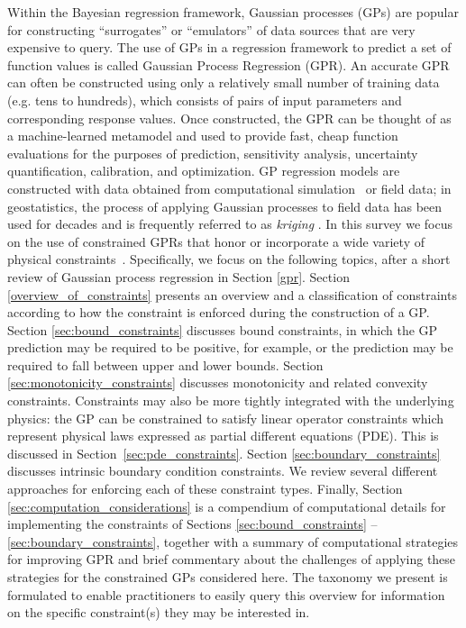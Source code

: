 Within the Bayesian regression framework, Gaussian processes (GPs) are popular for constructing ``surrogates'' or ``emulators'' of data sources that are very expensive to query.  The use of GPs in a 
regression framework to predict a set of function values is called Gaussian Process Regression (GPR). 
An accurate GPR can often be constructed using only a relatively small number of training data (e.g. tens to hundreds), which consists of pairs of input 
parameters and corresponding response values.  Once constructed, the GPR can be thought of as a machine-learned metamodel and used to provide 
fast, cheap function evaluations for the purposes of prediction, sensitivity 
analysis, uncertainty quantification, calibration, and optimization. 
GP regression models are constructed with data obtained from computational simulation~ or field data; in geostatistics, the process of applying Gaussian processes to field data has been used for decades and is frequently referred to as \emph{kriging} . 
In this survey we focus on the use of constrained GPRs
that honor or incorporate a wide variety of physical constraints~.
Specifically,
we focus on the following topics, after a short review of Gaussian process regression in Section \ref{gpr}. 
Section \ref{overview_of_constraints} presents an overview and a classification of constraints according to how the constraint is enforced during the construction of a GP. 
Section \ref{sec:bound_constraints} discusses bound constraints, in which the GP prediction may be required to be positive, for example, or the prediction may be required to fall between upper and lower bounds.
Section \ref{sec:monotonicity_constraints} discusses monotonicity and related convexity constraints.
Constraints may also be more 
tightly integrated with the underlying physics:  the GP can be constrained to satisfy 
linear operator constraints which represent physical laws expressed as partial different equations (PDE). 
This is discussed in Section~\ref{sec:pde_constraints}.  
Section \ref{sec:boundary_constraints} discusses intrinsic boundary condition constraints.
We review several different approaches for enforcing each of these constraint types. 
Finally, Section \ref{sec:computation_considerations} is a compendium of computational details for implementing the constraints of Sections \ref{sec:bound_constraints} -- \ref{sec:boundary_constraints}, together with a summary of computational strategies for improving GPR and brief commentary about the challenges of applying these strategies for the constrained GPs considered here.
The taxonomy we present is formulated to enable practitioners to easily query this overview for information on the specific constraint(s) they may be interested in. 
